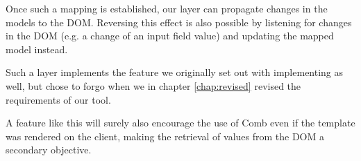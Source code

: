 \documentclass[thesis.tex]{subfiles}
\begin{document}
Once such a mapping is established, our layer can propagate changes in the
models to the DOM. Reversing this effect is also possible by listening for
changes in the DOM (e.g. a change of an input field value) and updating the
mapped model instead.

Such a layer implements the feature we originally set out with implementing as
well, but chose to forgo when we in chapter \ref{chap:revised} revised the
requirements of our tool.

A feature like this will surely also encourage the use of Comb even if the
template was rendered on the client, making the retrieval of values from the DOM
a secondary objective.
\end{document}
